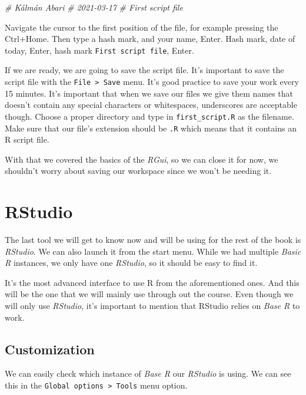 \documentclass[
]{book}
\newenvironment{Shaded}{\begin{snugshade}}{\end{snugshade}}
\newcommand{\CommentTok}[1]{\textcolor[rgb]{0.56,0.35,0.01}{\textit{#1}}}
\begin{document}
\begin{Shaded}
\begin{Highlighting}[]
\CommentTok{\# Kálmán Abari}
\CommentTok{\# 2021{-}03{-}17}
\CommentTok{\# First script file}
\end{Highlighting}
\end{Shaded}

Navigate the cursor to the first position of the file, for example
pressing the Ctrl+Home. Then type a hash mark, and your name,
Enter. Hash mark, date of today, Enter, hash mark
\texttt{First\ script\ file}, Enter.

If we are ready, we are going to save the script file. It's important to
save the script file with the \texttt{File\ \textgreater{}\ Save} menu. It's good practice to
save your work every 15 minutes. It's important that when we save our
files we give them names that doesn't contain any special characters or
whitespaces, underscores are acceptable though. Choose a proper
directory and type in \texttt{first\_script.R} as the filename. Make sure that
our file's extension should be \texttt{.R} which means that it contains an R
script file.

With that we covered the basics of the \emph{RGui}, so we can close it for
now, we shouldn't worry about saving our workspace since we won't be
needing it.

\hypertarget{rstudio}{%
\section{RStudio}\label{rstudio}}

The last tool we will get to know now and will be using for the rest of
the book is \emph{RStudio}. We can also launch it from the start menu. While
we had multiple \emph{Basic R} instances, we only have one \emph{RStudio}, so it
should be easy to find it.

It's the most advanced interface to use R from the aforementioned ones.
And this will be the one that we will mainly use through out the course.
Even though we will only use \emph{RStudio}, it's important to mention that
RStudio relies on \emph{Base R} to work.

\hypertarget{customization}{%
\subsection{Customization}\label{customization}}

We can easily check which instance of \emph{Base R} our \emph{RStudio} is using.
We can see this in the \texttt{Global\ options\ \textgreater{}\ Tools} menu option.
\end{document}
